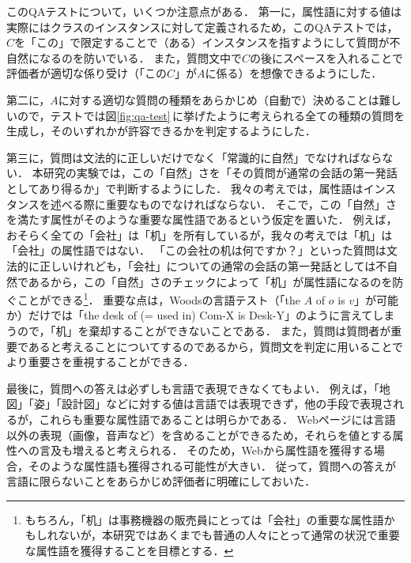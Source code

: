 このQAテストについて，いくつか注意点がある．
第一に，属性語に対する値は実際にはクラスのインスタンスに対して定義されるため，このQAテストでは，$C$を「この」で限定することで（ある）インスタンスを指すようにして質問が不自然になるのを防いでいる．
また，質問文中で$C$の後にスペースを入れることで評価者が適切な係り受け（「この$C$」が$A$に係る）を想像できるようにした．

第二に，$A$に対する適切な質問の種類をあらかじめ（自動で）決めることは難しいので，テストでは図\ref{fig:qa-test}\,に挙げたように考えられる全ての種類の質問を生成し，そのいずれかが許容できるかを判定するようにした．

第三に，質問は文法的に正しいだけでなく「常識的に自然」でなければならない．
本研究の実験では，この「自然」さを「その質問が通常の会話の第一発話としてあり得るか」で判断するようにした．
我々の考えでは，属性語はインスタンスを述べる際に重要なものでなければならない． 
そこで，この「自然」さを満たす属性がそのような重要な属性語であるという仮定を置いた．
例えば，おそらく全ての「会社」は「机」を所有しているが，我々の考えでは「机」は「会社」の属性語ではない．
「この会社の机は何ですか？」といった質問は文法的に正しいけれども，「会社」についての通常の会話の第一発話としては不自然であるから，この「自然」さのチェックによって「机」が属性語になるのを防ぐことができる\footnote{もちろん，「机」は事務機器の販売員にとっては「会社」の重要な属性語かもしれないが，本研究ではあくまでも普通の人々にとって通常の状況で重要な属性語を獲得することを目標とする．}．
重要な点は，Woodsの言語テスト\cite{Woods_1975}（「the $A$ of $o$ is $v$」が可能か）だけでは「the desk of (= used in) Com-X is Desk-Y」のように言えてしまうので，「机」を棄却することができないことである．
また，質問は質問者が重要であると考えることについてするのであるから，質問文を判定に用いることでより重要さを重視することができる．

最後に，質問への答えは必ずしも言語で表現できなくてもよい．
例えば，「地図」「姿」「設計図」などに対する値は言語では表現できず，他の手段で表現されるが，これらも重要な属性語であることは明らかである．
Webページには言語以外の表現（画像，音声など）を含めることができるため，それらを値とする属性への言及も増えると考えられる． そのため，Webから属性語を獲得する場合，そのような属性語も獲得される可能性が大きい．
従って，質問への答えが言語に限らないことをあらかじめ評価者に明確にしておいた．


